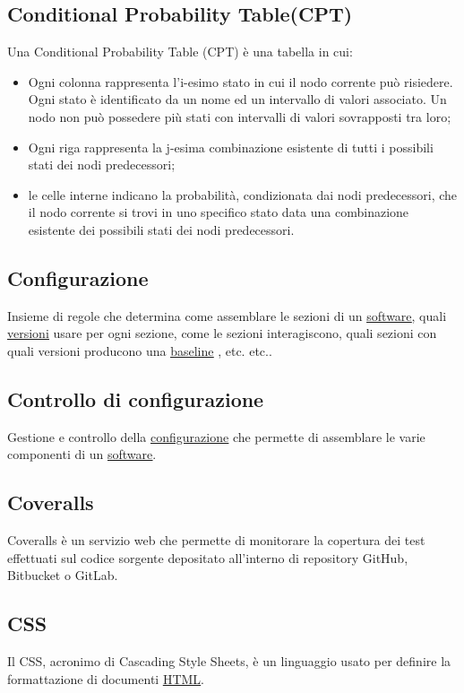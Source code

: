 	\subsection{Conditional Probability Table(CPT)}
	\label{sec:CPT}
	Una Conditional Probability Table (CPT) è una tabella in cui:
		\begin{itemize}
			\item{Ogni colonna rappresenta l'i-esimo stato in cui il nodo corrente può risiedere. Ogni stato è identificato da un nome ed un intervallo di valori associato. Un nodo non può possedere più stati con intervalli di valori sovrapposti tra loro;}
			\item{Ogni riga rappresenta la j-esima combinazione esistente di tutti i possibili stati dei nodi predecessori;}
			\item{le celle interne indicano la probabilità, condizionata dai nodi predecessori, che il nodo corrente si trovi in uno specifico stato data una combinazione esistente dei possibili stati dei nodi predecessori.}
		\end{itemize}


	\subsection{Configurazione}
	\label{sec:configurazione}
	Insieme di regole che determina come assemblare le sezioni di un \underline{\hyperref[sec:prodottosoftware]{software}}, quali \underline{\hyperref[sec:versione]{versioni}} usare per ogni sezione, come le sezioni interagiscono, quali sezioni con quali versioni producono una \underline{\hyperref[sec:baseline]{baseline}} , etc. etc..


	\subsection{Controllo di configurazione}
	\label{sec:controlloconfigurazione}
	Gestione e controllo della \underline{\hyperref[sec:configurazione]{configurazione}} che permette di assemblare le varie componenti di un \underline{\hyperref[sec:prodottosoftware]{software}}.
	\subsection{Coveralls}
	\label{sec:coveralls}
	Coveralls è un servizio web che permette di monitorare la copertura dei test effettuati sul codice sorgente depositato all'interno di repository GitHub, Bitbucket o GitLab.
	\subsection{CSS}
	\label{sec:css}
	Il CSS, acronimo di Cascading Style Sheets, è un linguaggio usato per definire la formattazione di documenti \underline{\hyperref[sec:html]{HTML}}.
	\newpage


